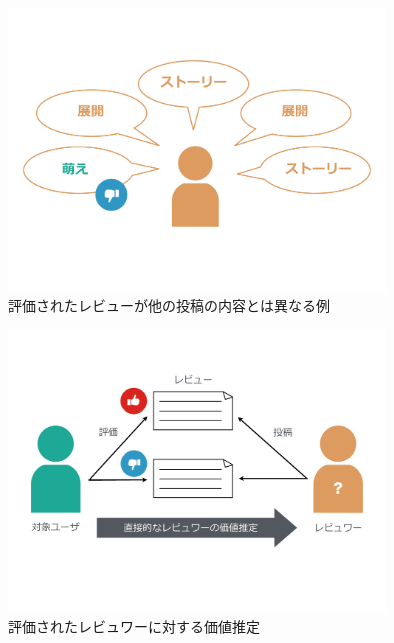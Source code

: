 \documentclass[a4paper,11pt,oneside,openany]{jsbook}
\begin{document}
\begin{figure}[htb]
	\begin{center} %
		\includegraphics[width = 100mm]{figures/confidence.pdf} %
	\end{center}
	\caption{評価されたレビューが他の投稿の内容とは異なる例} %
	\label{fig:conf} %
\end{figure}

\begin{figure}[htb]
	\begin{center} %
		\includegraphics[width = 100mm]{figures/trust1.pdf} %
	\end{center}
	\caption{評価されたレビュワーに対する価値推定} %
	\label{fig:trust1} %
\end{figure}
\end{document}
